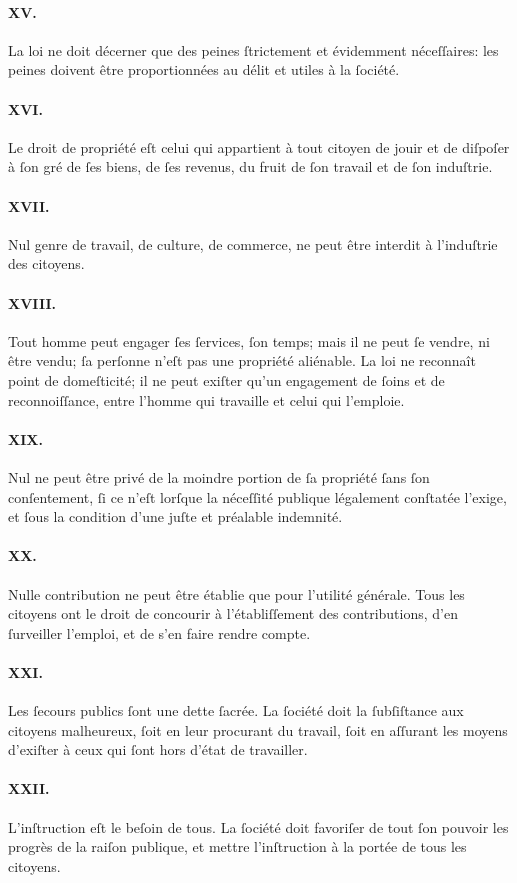 \documentclass[10pt, twoside]{lecturenotes}
\begin{document}
\paragraph*{XV.}La loi ne doit décerner que des peines ſtrictement et évidemment néceſſaires: les peines doivent être proportionnées au délit et utiles à la ſociété.
\paragraph*{XVI.}Le droit de propriété eſt celui qui appartient à tout citoyen de jouir et de diſpoſer à ſon gré de ſes biens, de ſes revenus, du fruit de ſon travail et de ſon induſtrie.
\paragraph*{XVII.}Nul genre de travail, de culture, de commerce, ne peut être interdit à l'induſtrie des citoyens.
\paragraph*{XVIII.}Tout homme peut engager ſes ſervices, ſon temps; mais il ne peut ſe vendre, ni être vendu; ſa perſonne n'eſt pas une propriété aliénable. La loi ne reconnaît point de domeſticité; il ne peut exiſter qu'un engagement de ſoins et de reconnoiſſance, entre l'homme qui travaille et celui qui l'emploie.
\paragraph*{XIX.}Nul ne peut être privé de la moindre portion de ſa propriété ſans ſon conſentement, ſi ce n'eſt lorſque la néceſſité publique légalement conſtatée l'exige, et ſous la condition d'une juſte et préalable indemnité.
\paragraph*{XX.}Nulle contribution ne peut être établie que pour l'utilité générale. Tous les citoyens ont le droit de concourir à l'établiſſement des contributions, d'en ſurveiller l'emploi, et de s'en faire rendre compte.
\paragraph*{XXI.}Les ſecours publics ſont une dette ſacrée. La ſociété doit la ſubſiſtance aux citoyens malheureux, ſoit en leur procurant du travail, ſoit en aſſurant les moyens d'exiſter à ceux qui ſont hors d'état de travailler.
\paragraph*{XXII.}L'inſtruction eſt le beſoin de tous. La ſociété doit favoriſer de tout ſon pouvoir les progrès de la raiſon publique, et mettre l'inſtruction à la portée de tous les citoyens.
\end{document}
